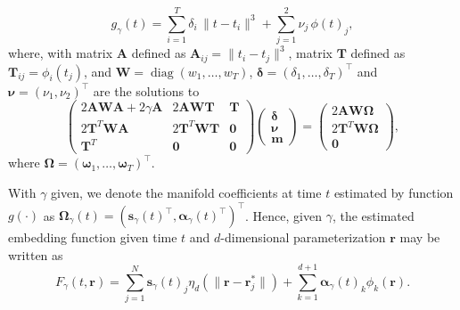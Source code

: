 \documentclass[11pt,reqno]{article}
\newcommand{\T}{\intercal}
\theoremstyle{definition}
\begin{document}
\begin{equation}
  g_{\gamma}(t) = \sum_{i=1}^{T}\delta_i \,\|t - t_i\|^{3} + \sum_{j=1}^{2}\nu_j\,\phi(t)_j, \label{eq:15}
\end{equation}
where, with matrix $\boldsymbol{A}$ defined as $\boldsymbol{A}_{ij} = \|t_i - t_j\|^{3}$, matrix $\boldsymbol{T}$ defined as $\boldsymbol{T}_{ij} = \phi_i(t_j)$, and $\boldsymbol{W} = \operatorname{diag}(w_1, \dots, w_T)$,  $\boldsymbol{\delta}=(\delta_1,\ldots,\delta_T)^\T$ and $\boldsymbol{\nu}=(\nu_1,\nu_2)^\T$ are the solutions to 
\begin{equation}
  \left(
  \begin{array}{ccc}
    2\boldsymbol{A}\boldsymbol{W}\boldsymbol{A} + 2\gamma\boldsymbol{A} & 2\boldsymbol{A}\boldsymbol{W}\boldsymbol{T} & \boldsymbol{T} \\
    2\boldsymbol{T}^{T}\boldsymbol{W}\boldsymbol{A} & 2\boldsymbol{T}^{T}\boldsymbol{W}\boldsymbol{T} & \boldsymbol{0} \\
    \boldsymbol{T}^{T} & \boldsymbol{0} & \boldsymbol{0}
  \end{array}
  \right)\left(
  \begin{array}{c}
    \boldsymbol{\delta} \\
    \boldsymbol{\nu} \\
    \boldsymbol{m}
  \end{array}
  \right) = \left(
  \begin{array}{c}
    2\boldsymbol{A}\boldsymbol{W}\boldsymbol{\Omega} \\
    2\boldsymbol{T}^{T}\boldsymbol{W}\boldsymbol{\Omega} \\
    \boldsymbol{0}
  \end{array}
  \right), \label{eq:16}
\end{equation}
where $\boldsymbol{\Omega}=(\boldsymbol{\omega}_1,\ldots, \boldsymbol{\omega}_T)^\T$.

With $\gamma$ given, we denote the manifold coefficients at time $t$ estimated by function $g(\cdot)$ as $\boldsymbol{\Omega}_{\gamma}(t) = \left(\boldsymbol{s}_{\gamma}(t)^\T, \boldsymbol{\alpha}_{\gamma}(t)^\T\right)^\T$. Hence, given $\gamma$, the estimated embedding function given time $t$ and $d$-dimensional parameterization $\boldsymbol{r}$ may be written as
\begin{equation}
  F_{\gamma}(t, \boldsymbol{r}) = \sum_{j=1}^{N}\boldsymbol{s}_{\gamma}(t)_j \eta_{d}\left(\|\boldsymbol{r} - \boldsymbol{r}_j^*\|\right) + \sum_{k=1}^{d+1}\boldsymbol{\alpha}_{\gamma}(t)_k \phi_k(\boldsymbol{r}). \label{eq:17}
\end{equation}
\end{document}
